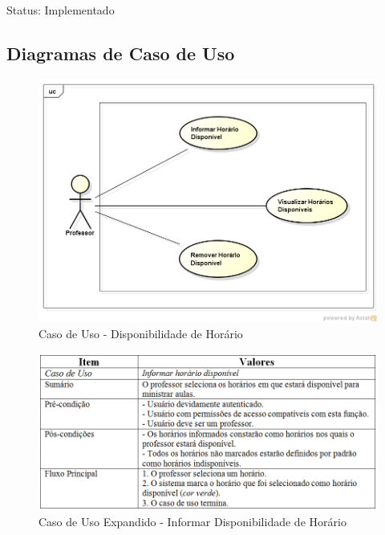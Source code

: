 \documentclass{abnt}
\begin{document}
		Status: Implementado
			
		\subsection{Diagramas de Caso de Uso}
		\begin{figure}[h]
			\begin{center}
				 \includegraphics[width=450px]{CasoUsoDisponibilidadeHorario}
				 \caption{Caso de Uso - Disponibilidade de Horário}
				 \label{fig:CasoUsoDisponibilidadeHorario}
			\end{center}
		\end{figure}
		
		
		\begin{figure}[h]
					\begin{center}
						 \includegraphics[width=450px]{casoUsoInformarHorarioDisponivelAula}
						 \caption{Caso de Uso Expandido - Informar Disponibilidade de Horário}
					\end{center}
		\end{figure}
		
\end{document}
